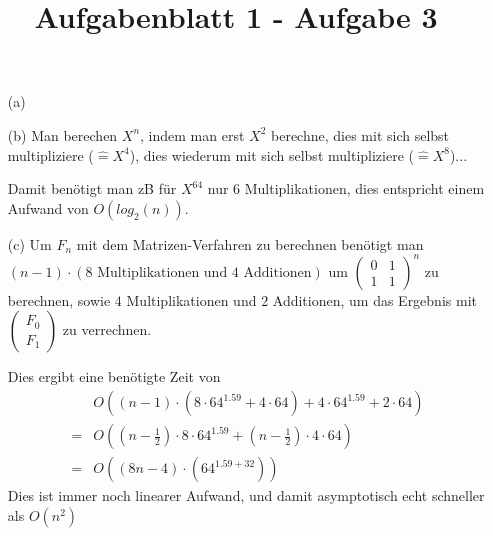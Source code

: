\documentclass{article}
\title{Aufgabenblatt 1 - Aufgabe 3}
\author{}
\begin{document}
\maketitle

\begin{enumerate}
\item[(a)]

\item[(b)]
Man berechen $X^n$, indem man erst $X^2$ berechne, dies mit sich 
selbst multipliziere ($\widehat{=} X^4$), dies wiederum mit sich 
selbst multipliziere ($\widehat{=} X^8$)... 

Damit benötigt man zB für $X^{64}$ nur 6 Multiplikationen, 
dies entspricht einem Aufwand von $O(log_2(n))$.

\item[(c)]
Um $F_n$ mit dem Matrizen-Verfahren zu berechnen benötigt man 
$(n-1) \cdot (8 \text{ Multiplikationen und } 4 \text{ Additionen})$ 
um $\begin{pmatrix} 0 & 1 \\ 1 & 1 \end{pmatrix}^n$ zu berechnen, 
sowie $4$ Multiplikationen und $2$ Additionen, um das Ergebnis mit 
$\begin{pmatrix} F_0 \\ F_1 \end{pmatrix}$ zu verrechnen. 

Dies ergibt eine benötigte Zeit von 
\begin{align*}
&O((n-1) \cdot (8 \cdot 
64^{1.59} + 4 \cdot 64)+ 4 \cdot 64^{1.59} + 2 \cdot 64) \\ = 
&O((n-\frac{1}{2}) \cdot 8 \cdot 64^{1.59} + (n-\frac{1}{2})\cdot 4 \cdot 64) \\ 
= &O((8n-4)\cdot (64^{1.59 + 32}))
\end{align*}  
Dies ist immer noch linearer Aufwand, und damit asymptotisch 
echt schneller als $O(n^2)$
\end{enumerate}
\end{document}
